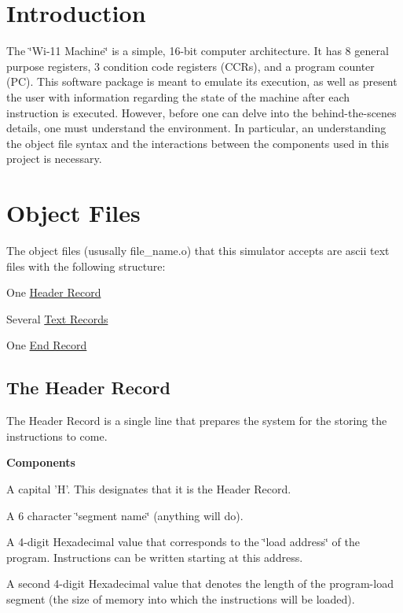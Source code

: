 \hypertarget{index_intro}{}\section{Introduction}\label{index_intro}
The \char`\"{}Wi-\/11 Machine\char`\"{} is a simple, 16-\/bit computer architecture. It has 8 general purpose registers, 3 condition code registers (CCRs), and a program counter (PC). This software package is meant to emulate its execution, as well as present the user with information regarding the state of the machine after each instruction is executed. However, before one can delve into the behind-\/the-\/scenes details, one must understand the environment. In particular, an understanding the object file syntax and the interactions between the components used in this project is necessary.\hypertarget{index_syntax}{}\section{Object Files}\label{index_syntax}
\begin{DoxyParagraph}{}
The object files (ususally file\_\-name.o) that this simulator accepts are ascii text files with the following structure: \begin{DoxyItemize}
\item One \hyperlink{index_header}{Header Record} \item Several \hyperlink{index_text}{Text Records} \item One \hyperlink{index_end}{End Record}\end{DoxyItemize}

\end{DoxyParagraph}
\hypertarget{index_header}{}\subsection{The Header Record}\label{index_header}
\begin{DoxyParagraph}{}
The Header Record is a single line that prepares the system for the storing the instructions to come. 
\end{DoxyParagraph}
\begin{DoxyParagraph}{}
{\bfseries Components} \begin{DoxyItemize}
\item A capital 'H'. This designates that it is the Header Record. \item A 6 character \char`\"{}segment name\char`\"{} (anything will do). \item A 4-\/digit Hexadecimal value that corresponds to the \char`\"{}load address\char`\"{} of the program. Instructions can be written starting at this address. \item A second 4-\/digit Hexadecimal value that denotes the length of the program-\/load segment (the size of memory into which the instructions will be loaded). \end{DoxyItemize}

\end{DoxyParagraph}
